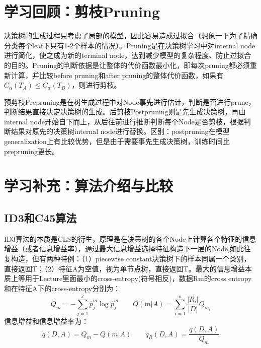 \documentclass[cn]{elegantpaper}
\begin{document}
\section{学习回顾：剪枝Pruning}
决策树的生成过程只考虑了局部的模型，因此容易造成过拟合（想象一下为了精确分类每个leaf下只有1-2个样本的情况）。Pruning是在决策树学习中对internal node进行简化，使之成为新的terminal node，达到减少模型的复杂程度、防止过拟合的目的。Pruning的判断依据是让整体的代价函数最小化，即每次pruning都必须重新计算，并比较before pruning和after pruning的整体代价函数，如果有$C_{\alpha}\left(T_{A}\right) \leqslant C_{\alpha}\left(T_{B}\right)$，则进行剪枝。

预剪枝Prepruning是在树生成过程中对Node事先进行估计，判断是否进行prune，判断结果直接决定决策树的生成。后剪枝Postpruning则是先生成决策树，再由internal node开始自下而上，从后往前进行推断判断每个Node是否剪枝，根据判断结果对原先的决策树internal node进行替换。区别：postpruning在模型generalization上有比较优势，但是由于需要事先生成决策树，训练时间比prepruning更长。

\section{学习补充：算法介绍与比较}
\subsection{ID3和C45算法}
ID3算法的本质是CLS的衍生，原理是在决策树的各个Node上计算各个特征的信息增益（或者信息增益率），通过最大信息增益选择特征构造下一层的Node,如此往复构造，但有两种特例：（1）piecewise constant决策树下的样本同属一个类别，直接返回T；（2）特征A为空值，视为单节点树，直接返回T。最大的信息增益本质上等用于Lecture里面最小的cross-entropy(符号相反)，数据Rm的cross entropy和在特征A下的cross-entropy分别为：
\begin{equation}
Q_{m}=-\sum_{j=1}^{j} \widehat{p}_{j}^{m} \log \widehat{p}_{j}^{m} \quad \quad
Q(m|A)=\sum_{i=1}^{n}\frac{\left|R_{i}\right|}{|D|}Q_{m_{i}}
\end{equation}
信息增益和信息增益率为：
\begin{equation}
q(D,A) = Q_{m}-Q(m|A) \quad\quad q_{R}(D,A) = \frac{q(D,A)}{Q_{m}}
\end{equation}
\end{document}
